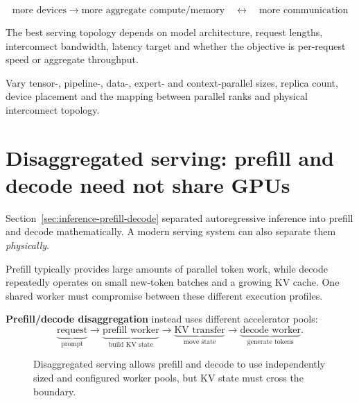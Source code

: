 \[
\boxed{
\text{more devices}
\rightarrow
\text{more aggregate compute/memory}
\quad\longleftrightarrow\quad
\text{more communication}
}
\]

The best serving topology depends on model architecture, request lengths, interconnect bandwidth, latency target and whether the objective is per-request speed or aggregate throughput.

\begin{calloutdegreeofexperiment}
Vary tensor-, pipeline-, data-, expert- and context-parallel sizes, replica count, device placement and the mapping between parallel ranks and physical interconnect topology.
\end{calloutdegreeofexperiment}


\section{Disaggregated serving: prefill and decode need not share GPUs}
\label{sec:inference-disaggregation}
Section~\ref{sec:inference-prefill-decode} separated autoregressive inference into prefill and decode mathematically.
A modern serving system can also separate them \emph{physically}.

Prefill typically provides large amounts of parallel token work, while decode repeatedly operates on small new-token batches and a growing KV cache.
One shared worker must compromise between these different execution profiles.

\textbf{Prefill/decode disaggregation} instead uses different accelerator pools:
\[
\underbrace{\text{request}}_{\text{prompt}}
\rightarrow
\underbrace{\text{prefill worker}}_{\text{build KV state}}
\rightarrow
\underbrace{\text{KV transfer}}_{\text{move state}}
\rightarrow
\underbrace{\text{decode worker}}_{\text{generate tokens}}.
\]

\begin{figure}[htbp]
\centering
{}
\caption{Disaggregated serving allows prefill and decode to use independently sized and configured worker pools, but KV state must cross the boundary.}
\label{fig:prefill-decode-disaggregation}
\end{figure}

